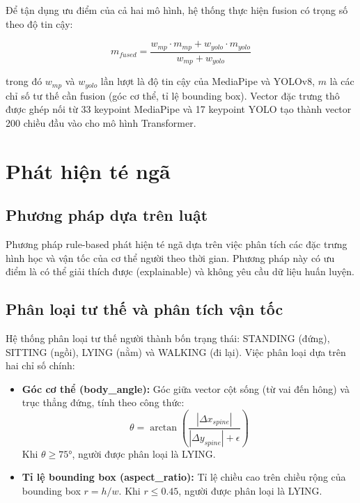 Để tận dụng ưu điểm của cả hai mô hình, hệ thống thực hiện fusion có trọng số theo độ tin cậy:

\begin{equation}
    m_{fused} = \frac{w_{mp} \cdot m_{mp} + w_{yolo} \cdot m_{yolo}}{w_{mp} + w_{yolo}}
\end{equation}

trong đó $w_{mp}$ và $w_{yolo}$ lần lượt là độ tin cậy của MediaPipe và YOLOv8, $m$ là các chỉ số tư thế cần fusion (góc cơ thể, tỉ lệ bounding box). Vector đặc trưng thô được ghép nối từ 33 keypoint MediaPipe và 17 keypoint YOLO tạo thành vector 200 chiều đầu vào cho mô hình Transformer.


\section{Phát hiện té ngã}

\subsection{Phương pháp dựa trên luật}

Phương pháp rule-based phát hiện té ngã dựa trên việc phân tích các đặc trưng hình học và vận tốc của cơ thể người theo thời gian. Phương pháp này có ưu điểm là có thể giải thích được (explainable) và không yêu cầu dữ liệu huấn luyện.

\subsection{Phân loại tư thế và phân tích vận tốc}

Hệ thống phân loại tư thế người thành bốn trạng thái: STANDING (đứng), SITTING (ngồi), LYING (nằm) và WALKING (đi lại). Việc phân loại dựa trên hai chỉ số chính:

\begin{itemize}
    \item \textbf{Góc cơ thể (body\_angle):} Góc giữa vector cột sống (từ vai đến hông) và trục thẳng đứng, tính theo công thức:
    \begin{equation}
        \theta = \arctan\left(\frac{|\Delta x_{spine}|}{|\Delta y_{spine}| + \epsilon}\right)
    \end{equation}
    Khi $\theta \geq 75°$, người được phân loại là LYING.

    \item \textbf{Tỉ lệ bounding box (aspect\_ratio):} Tỉ lệ chiều cao trên chiều rộng của bounding box $r = h/w$. Khi $r \leq 0.45$, người được phân loại là LYING.
\end{itemize}

